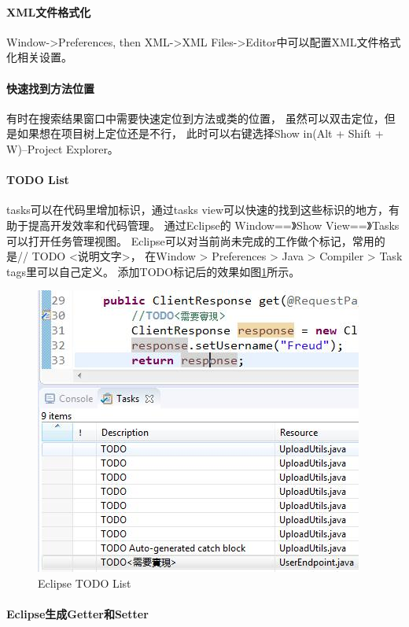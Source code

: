 \documentclass{book}
\begin{document}
\paragraph{XML文件格式化}

Window->Preferences, then XML->XML Files->Editor中可以配置XML文件格式化相关设置。

\paragraph{快速找到方法位置}

有时在搜索结果窗口中需要快速定位到方法或类的位置，
虽然可以双击定位，但是如果想在项目树上定位还是不行，
此时可以右键选择Show in(Alt + Shift + W)--Project Explorer。

\paragraph{TODO List}
tasks可以在代码里增加标识，通过tasks view可以快速的找到这些标识的地方，有助于提高开发效率和代码管理。
通过Eclipse的 Window==》Show View==》Tasks可以打开任务管理视图。
Eclipse可以对当前尚未完成的工作做个标记，常用的是// TODO <说明文字>，
在Window > Preferences > Java > Compiler > Task tags里可以自己定义。
添加TODO标记后的效果如图\ref{code:EclipseToDoList}所示。

\begin{figure}[htbp]
	\centering
	\includegraphics[scale=0.6]{EclipseToDoList.jpg}
	\caption{Eclipse TODO List}
	\label{code:EclipseToDoList}
\end{figure}

\paragraph{Eclipse生成Getter和Setter}
\end{document}
